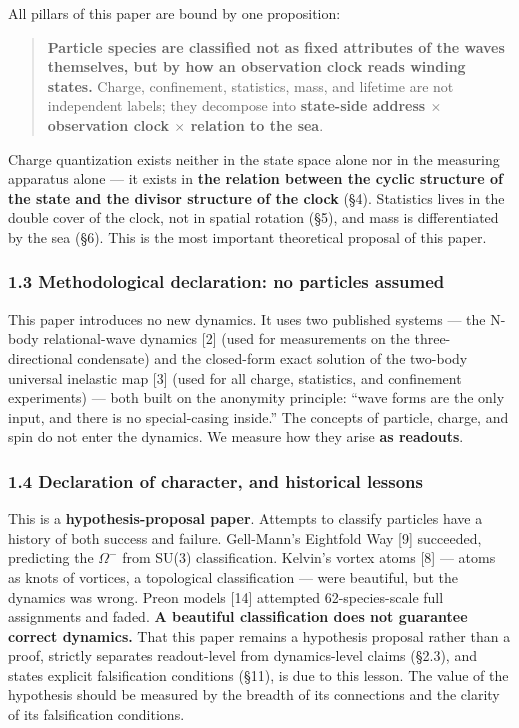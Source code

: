 \documentclass[
]{article}
\begin{document}
All pillars of this paper are bound by one proposition:

\begin{quote}
\textbf{Particle species are classified not as fixed attributes of the
waves themselves, but by how an observation clock reads winding states.}
Charge, confinement, statistics, mass, and lifetime are not independent
labels; they decompose into \textbf{state-side address \(\times\)
observation clock \(\times\) relation to the sea}.
\end{quote}

Charge quantization exists neither in the state space alone nor in the
measuring apparatus alone --- it exists in \textbf{the relation between
the cyclic structure of the state and the divisor structure of the
clock} (§4). Statistics lives in the double cover of the clock, not in
spatial rotation (§5), and mass is differentiated by the sea (§6). This
is the most important theoretical proposal of this paper.

\subsubsection{1.3 Methodological declaration: no particles
assumed}\label{methodological-declaration-no-particles-assumed}

This paper introduces no new dynamics. It uses two published systems ---
the N-body relational-wave dynamics {[}2{]} (used for measurements on
the three-directional condensate) and the closed-form exact solution of
the two-body universal inelastic map {[}3{]} (used for all charge,
statistics, and confinement experiments) --- both built on the anonymity
principle: ``wave forms are the only input, and there is no
special-casing inside.'' The concepts of particle, charge, and spin do
not enter the dynamics. We measure how they arise \textbf{as readouts}.

\subsubsection{1.4 Declaration of character, and historical
lessons}\label{declaration-of-character-and-historical-lessons}

This is a \textbf{hypothesis-proposal paper}. Attempts to classify
particles have a history of both success and failure. Gell-Mann's
Eightfold Way {[}9{]} succeeded, predicting the \(\Omega^-\) from SU(3)
classification. Kelvin's vortex atoms {[}8{]} --- atoms as knots of
vortices, a topological classification --- were beautiful, but the
dynamics was wrong. Preon models {[}14{]} attempted 62-species-scale
full assignments and faded. \textbf{A beautiful classification does not
guarantee correct dynamics.} That this paper remains a hypothesis
proposal rather than a proof, strictly separates readout-level from
dynamics-level claims (§2.3), and states explicit falsification
conditions (§11), is due to this lesson. The value of the hypothesis
should be measured by the breadth of its connections and the clarity of
its falsification conditions.
\end{document}
